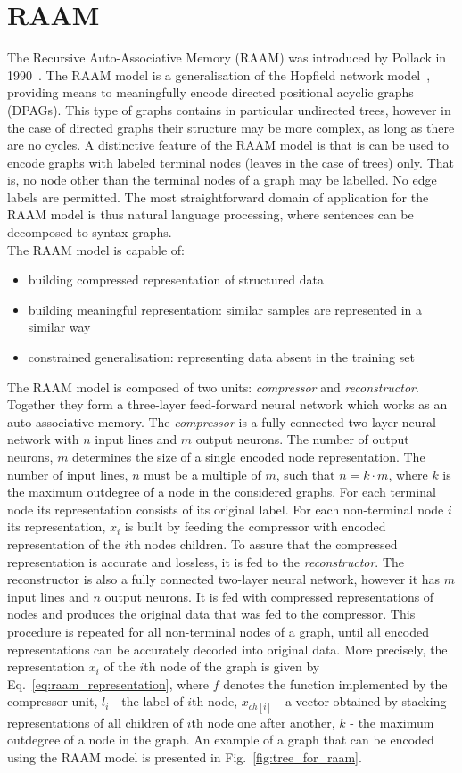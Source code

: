 \section{RAAM}
The Recursive Auto-Associative Memory (RAAM) was introduced by Pollack in 1990~\cite{pollack1990recursive}. The RAAM model is a generalisation of the Hopfield network model~\cite{goulon2005hopfield}, providing means to meaningfully encode directed positional acyclic graphs (DPAGs). This type of graphs contains in particular undirected trees, however in the case of directed graphs their structure may be more complex, as long as there are no cycles. A distinctive feature of the RAAM model is that is can be used to encode graphs with labeled terminal nodes (leaves in the case of trees) only. That is, no node other than the terminal nodes of a graph may be labelled. No edge labels are permitted. The most straightforward domain of application for the RAAM model is thus natural language processing, where sentences can be decomposed to syntax graphs.\\
\noindent The RAAM model is capable of:
\begin{itemize}
	\item building compressed representation of structured data
	\item building meaningful representation: similar samples are represented in a similar way
	\item constrained generalisation: representing data absent in the training set
\end{itemize}
The RAAM model is composed of two units: \emph{compressor} and \emph{reconstructor}. Together they form a three-layer feed-forward neural network which works as an auto-associative memory. The \emph{compressor} is a fully connected two-layer neural network with $n$ input lines and $m$ output neurons. The number of output neurons, $m$ determines the size of a single encoded node representation. The number of input lines, $n$ must be a multiple of $m$, such that $n = k \cdot m$, where $k$ is the maximum outdegree of a node in the considered graphs. For each terminal node its representation consists of its original label. For each non-terminal node $i$ its representation, $x_i$ is built by feeding the compressor with encoded representation of the $i$th nodes children. To assure that the compressed representation is accurate and lossless, it is fed to the \emph{reconstructor}. The reconstructor is also a fully connected two-layer neural network, however it has $m$ input lines and $n$ output neurons. It is fed with compressed representations of nodes and produces the original data that was fed to the compressor. This procedure is repeated for all non-terminal nodes of a graph, until all encoded representations can be accurately decoded into original data. More precisely, the representation $x_i$ of the $i$th node of the graph is given by Eq.~\ref{eq:raam_representation}, where $f$ denotes the function implemented by the compressor unit, $l_i$ - the label of $i$th node, $x_{ch[i]}$ - a vector obtained by stacking representations of all children of $i$th node one after another, $k$ - the maximum outdegree of a node in the graph. An example of a graph that can be encoded using the RAAM model is presented in Fig.~\ref{fig:tree_for_raam}.

